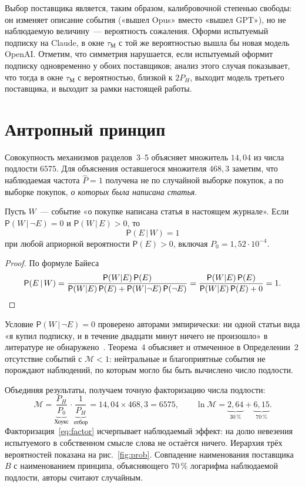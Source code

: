 \documentclass[11pt,a4paper]{article}
\newcommand{\tM}{\tau_{\mathrm{М}}}
\newcommand{\Mp}{\mathcal{M}}
\begin{document}
Выбор поставщика является, таким образом, калибровочной степенью свободы: он изменяет описание события («вышел Opus» вместо «вышел GPT»), но не наблюдаемую величину~--- вероятность сожаления. Оформи испытуемый подписку на Claude, в окне $\tM$ с той же вероятностью вышла бы новая модель OpenAI. Отметим, что симметрия нарушается, если испытуемый оформит подписку одновременно у обоих поставщиков; анализ этого случая показывает, что тогда в окне $\tM$ с вероятностью, близкой к $2P_H$, выходит модель третьего поставщика, и выходит за рамки настоящей работы.

\section{Антропный принцип}

Совокупность механизмов разделов~3--5 объясняет множитель $14{,}04$ из числа подлости $6575$. Для объяснения оставшегося множителя $468{,}3$ заметим, что наблюдаемая частота $\hat P = 1$ получена не по случайной выборке покупок, а по выборке покупок, \emph{о которых была написана статья}.

\begin{theorem}
Пусть $W$~--- событие «о покупке написана статья в настоящем журнале». Если $\mathsf{P}(W\,|\,\neg E) = 0$ и $\mathsf{P}(W\,|\,E) > 0$, то
\[
\mathsf{P}(E\,|\,W) = 1
\]
при любой априорной вероятности $\mathsf{P}(E) > 0$, включая $P_0 = 1{,}52\cdot10^{-4}$.
\end{theorem}

\begin{proof}
По формуле Байеса
\[
\mathsf{P}(E\,|\,W) = \frac{\mathsf{P}(W|E)\,\mathsf{P}(E)}{\mathsf{P}(W|E)\,\mathsf{P}(E) + \mathsf{P}(W|\neg E)\,\mathsf{P}(\neg E)} = \frac{\mathsf{P}(W|E)\,\mathsf{P}(E)}{\mathsf{P}(W|E)\,\mathsf{P}(E) + 0} = 1. \qedhere
\]
\end{proof}

Условие $\mathsf{P}(W\,|\,\neg E) = 0$ проверено авторами эмпирически: ни одной статьи вида «я купил подписку, и в течение двадцати минут ничего не произошло» в литературе не обнаружено~\cite{antrop}. Теорема~4 объясняет и отмеченное в Определении~2 отсутствие событий с $\Mp<1$: нейтральные и благоприятные события не порождают наблюдений, по которым могло бы быть вычислено число подлости.

Объединяя результаты, получаем точную факторизацию числа подлости:
\begin{equation}
\Mp = \underbrace{\frac{P_H}{P_0}}_{\text{Хоукс}}\cdot\underbrace{\frac{1}{P_H}}_{\text{отбор}} = 14{,}04\times 468{,}3 = 6575,
\qquad
\ln\Mp = \underbrace{2{,}64}_{30\,\%} + \underbrace{6{,}15}_{70\,\%}.
\label{eq:factor}
\end{equation}
Факторизация~\eqref{eq:factor} исчерпывает наблюдаемый эффект: на долю невезения испытуемого в собственном смысле слова не остаётся ничего. Иерархия трёх вероятностей показана на рис.~\ref{fig:prob}. Совпадение наименования поставщика $B$ с наименованием принципа, объясняющего $70\,\%$ логарифма наблюдаемой подлости, авторы считают случайным.
\end{document}
